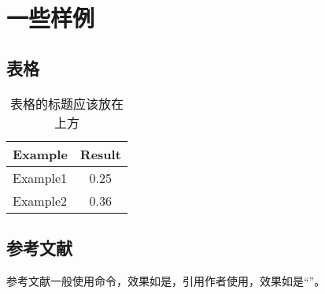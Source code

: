 
\section{一些样例}

\subsection{表格}

\begin{table}[htb]
    \begin{center}
        \caption{表格的标题应该放在上方}\label{table}
        \begin{tabular}{lc} %
            \toprule
            Example & Result \\
            \midrule
            Example1          & 0.25 \\
            Example2          & 0.36 \\
            \bottomrule
        \end{tabular}
    \end{center}
\end{table}

\subsection{参考文献}

参考文献一般使用命令，效果如是\cite{Nicholas1998Handbook}，引用作者使用，效果如是“\citeauthor{goossens1994latex}”。
